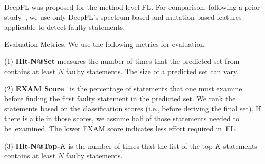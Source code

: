 
DeepFL was proposed for the method-level FL. For comparison, following
a prior study~\cite{icse21-fl}, we use only DeepFL's spectrum-based
and mutation-based features applicable to detect faulty statements.


\underline{Evaluation Metrics.}  
We use the following metrics for evaluation:

(1) {\bf Hit-N@Set} measures the number of times that the predicted
set from {\tool} contains at least $N$ faulty statements. The size of a
predicted set can vary.


(2) {\bf EXAM Score}~\cite{wong2008crosstab} is the percentage of
statements that one must examine before finding the first
faulty statement in the predicted set. We rank the statements based on
the classification scores (i.e., before deriving the final set).
If there is a tie in those scores, we assume half of
those statements needed to be~examined. The lower EXAM score indicates
less effort required in~FL.

(3) {\bf Hit-N@Top-$K$} is the number of times that the list of the top-$K$
statements contains at least $N$ faulty statements.



